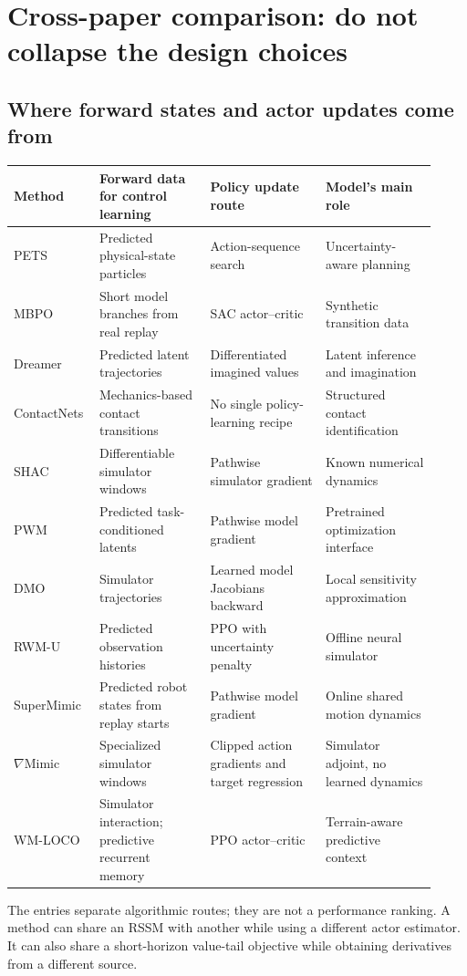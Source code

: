 \section{Cross-paper comparison: do not collapse the design choices}\label{sec:comparison}
\subsection{Where forward states and actor updates come from}
\begin{longtable}{@{}L{0.16\linewidth}L{0.25\linewidth}L{0.26\linewidth}L{0.25\linewidth}@{}}
\toprule Method & Forward data for control learning & Policy update route & Model's main role\\\midrule\endhead
PETS & Predicted physical-state particles & Action-sequence search & Uncertainty-aware planning\\
MBPO & Short model branches from real replay & SAC actor--critic & Synthetic transition data\\
Dreamer & Predicted latent trajectories & Differentiated imagined values & Latent inference and imagination\\
ContactNets & Mechanics-based contact transitions & No single policy-learning recipe & Structured contact identification\\
SHAC & Differentiable simulator windows & Pathwise simulator gradient & Known numerical dynamics\\
PWM & Predicted task-conditioned latents & Pathwise model gradient & Pretrained optimization interface\\
DMO & Simulator trajectories & Learned model Jacobians backward & Local sensitivity approximation\\
RWM-U & Predicted observation histories & PPO with uncertainty penalty & Offline neural simulator\\
SuperMimic & Predicted robot states from replay starts & Pathwise model gradient & Online shared motion dynamics\\
$\nabla$Mimic & Specialized simulator windows & Clipped action gradients and target regression & Simulator adjoint, no learned dynamics\\
WM-LOCO & Simulator interaction; predictive recurrent memory & PPO actor--critic & Terrain-aware predictive context\\
\bottomrule
\end{longtable}
The entries separate algorithmic routes; they are not a performance ranking.
A method can share an RSSM with another while using a different actor estimator.
It can also share a short-horizon value-tail objective while obtaining derivatives
from a different source.

